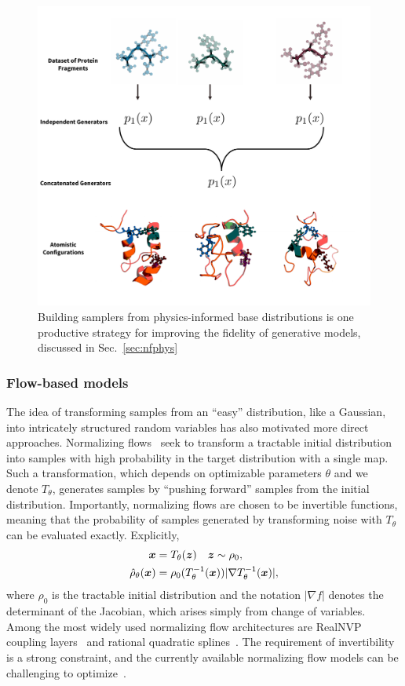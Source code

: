 \documentclass[11pt]{article}
\begin{document}
\begin{figure}
    \centering
    \includegraphics[width=0.75\linewidth]{modular_fig.pdf}
    \caption{Building samplers from physics-informed base distributions is one productive strategy for improving the fidelity of generative models, discussed in Sec.~\ref{sec:nfphys}}
    \label{fig:modular}
\end{figure}

\subsubsection{Flow-based models}\label{sec:flowmatch}

The idea of transforming samples from an ``easy'' distribution, like a Gaussian, into intricately structured random variables has also motivated more direct approaches.
Normalizing flows~\cite{tabak_density_2010,rezende_variational_2015} seek to transform a tractable initial distribution into samples with high probability in the target distribution with a single map.
Such a transformation, which depends on optimizable parameters $\theta$ and we denote $T_{\theta}$, generates samples by ``pushing forward'' samples from the initial distribution. 
Importantly, normalizing flows are chosen to be invertible functions, meaning that the probability of samples generated by transforming noise with $T_{\theta}$ can be evaluated exactly.
Explicitly,
\begin{equation}
\begin{aligned}
    \boldsymbol{x} &= T_{\theta}(\boldsymbol{z}) \quad \boldsymbol{z} \sim \rho_0, \\
    \hat \rho_\theta(\boldsymbol{x}) &= \rho_0(T_{\theta}^{-1}(\boldsymbol{x})) |\nabla T_{\theta}^{-1}(\boldsymbol{x})|,
\end{aligned}
\end{equation}
where $\rho_0$ is the tractable initial distribution and the notation $|\nabla f|$ denotes the determinant of the Jacobian, which arises simply from change of variables. 
Among the most widely used normalizing flow architectures are RealNVP coupling layers~\cite{dinh_density_2017} and rational quadratic splines~\cite{durkan_neural_2019}.
The requirement of invertibility is a strong constraint, and the currently available normalizing flow models can be challenging to optimize~\cite{grathwohl_ffjord_2018,gabrie_adaptive_2022}.
\end{document}
